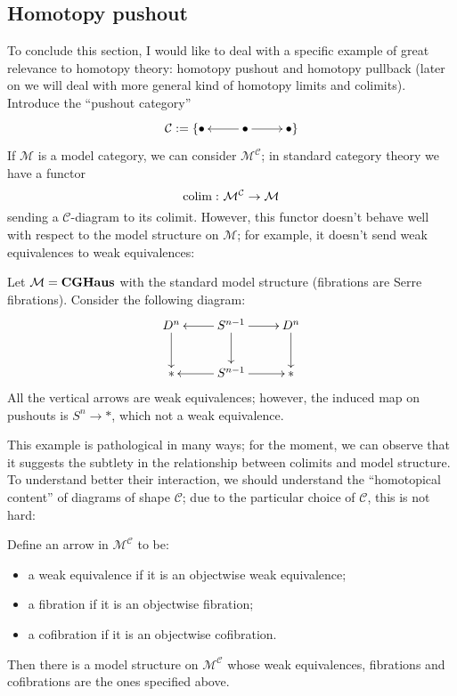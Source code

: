 \subsection{Homotopy pushout} \label{homotopy pushout}

To conclude this section, I would like to deal with a specific example of great relevance to homotopy theory: homotopy pushout and homotopy pullback (later on we will deal with more general kind of homotopy limits and colimits). Introduce the ``pushout category''
\[
\xymatrix{
\mathcal C := \{ \bullet & \bullet \ar[l] \ar[r] & \bullet \}
}
\]
If $\mathcal M$ is a model category, we can consider $\mathcal M^{\mathcal C}$; in standard category theory we have a functor
\[
\mathrm{colim} \, \colon \mathcal M^{\mathcal C} \to \mathcal M
\]
sending a $\mathcal C$-diagram to its colimit. However, this functor doesn't behave well with respect to the model structure on $\mathcal M$; for example, it doesn't send weak equivalences to weak equivalences:

\begin{eg} \label{eg pushout fails in homotopy}
Let $\mathcal M = \mathbf{CGHaus}$ with the standard model structure (fibrations are Serre fibrations). Consider the following diagram:
\[
\xymatrix{
D^n \ar[d] & S^{n-1} \ar[l] \ar[r] \ar[d] & D^n \ar[d] \\ \mathrm{*} & S^{n-1} \ar[r] \ar[l] & \mathrm{*}
}
\]
All the vertical arrows are weak equivalences; however, the induced map on pushouts is $S^n \to *$, which not a weak equivalence.
\end{eg}

This example is pathological in many ways; for the moment, we can observe that it suggests the subtlety in the relationship between colimits and model structure. To understand better their interaction, we should understand the ``homotopical content'' of diagrams of shape $\mathcal C$; due to the particular choice of $\mathcal C$, this is not hard:

\begin{lemma}
Define an arrow in $\mathcal M^{\mathcal C}$ to be:
\begin{itemize}
\item a weak equivalence if it is an objectwise weak equivalence;
\item a fibration if it is an objectwise fibration;
\item a cofibration if it is an objectwise cofibration.
\end{itemize}
Then there is a model structure on $\mathcal M^{\mathcal C}$ whose weak equivalences, fibrations and cofibrations are the ones specified above.
\end{lemma}

